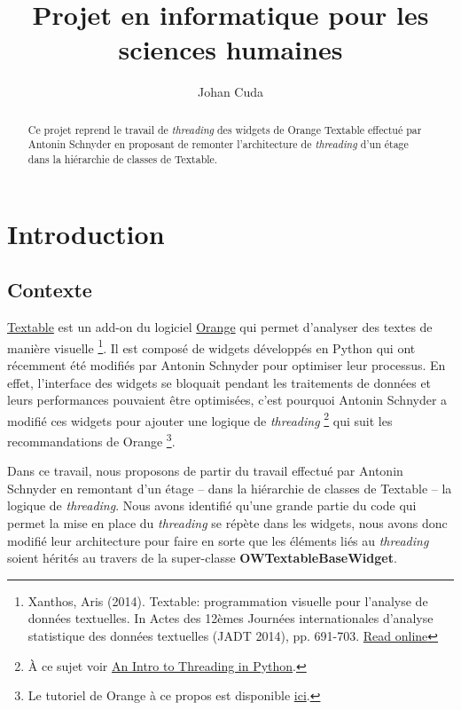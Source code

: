 \documentclass{article}
\title{Projet en informatique pour les sciences humaines}
\author{Johan Cuda}
\begin{document}
\maketitle

\begin{abstract}
Ce projet reprend le travail de \textit{threading} des widgets de Orange Textable effectué par Antonin Schnyder en proposant de remonter l'architecture de \textit{threading} d'un étage dans la hiérarchie de classes de Textable. 
\end{abstract}

\tableofcontents

\section{Introduction}

\subsection{Contexte}

\href{http://textable.io/}{Textable} est un add-on du logiciel \href{https://orangedatamining.com/}{Orange} qui permet d'analyser des textes de manière visuelle \footnote{Xanthos, Aris (2014). Textable: programmation visuelle pour l’analyse de données textuelles. In Actes des 12èmes Journées internationales d’analyse statistique des données textuelles (JADT 2014), pp. 691-703. \href{http://lexicometrica.univ-paris3.fr/jadt/jadt2014/01-ACTES/57-JADT2014.pdf}{Read online}}. Il est composé de widgets développés en Python qui ont récemment été modifiés par Antonin Schnyder pour optimiser leur processus. En effet, l'interface des widgets se bloquait pendant les traitements de données et leurs performances pouvaient être optimisées, c'est pourquoi Antonin Schnyder a modifié ces widgets pour ajouter une logique de \textit{threading} \footnote{À ce sujet voir \href{https://realpython.com/intro-to-python-threading/}{An Intro to Threading in Python}.} qui suit les recommandations de Orange \footnote{Le tutoriel de Orange à ce propos est disponible \href{https://orange3.readthedocs.io/projects/orange-development/en/latest/tutorial-responsive-gui.html}{ici}.}.\newline

Dans ce travail, nous proposons de partir du travail effectué par Antonin Schnyder en remontant d'un étage – dans la hiérarchie de classes de Textable – la logique de \textit{threading}. Nous avons identifié qu'une grande partie du code qui permet la mise en place du \textit{threading} se répète dans les widgets, nous avons donc modifié  leur architecture pour faire en sorte que les éléments liés au \textit{threading} soient hérités au travers de la super-classe \textbf{OWTextableBaseWidget}.
\newline
\end{document}
